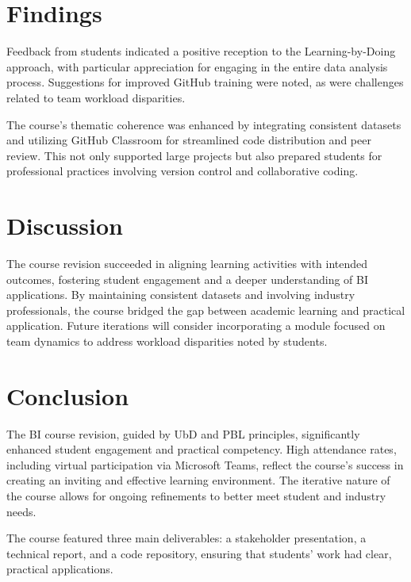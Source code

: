 \documentclass{article}
\begin{document}
\section{Findings}
Feedback from students indicated a positive reception to the Learning-by-Doing approach, with particular appreciation for engaging in the entire data analysis process. Suggestions for improved GitHub training were noted, as were challenges related to team workload disparities.

The course's thematic coherence was enhanced by integrating consistent datasets and utilizing GitHub Classroom for streamlined code distribution and peer review. This not only supported large projects but also prepared students for professional practices involving version control and collaborative coding.

\section{Discussion}
The course revision succeeded in aligning learning activities with intended outcomes, fostering student engagement and a deeper understanding of BI applications. By maintaining consistent datasets and involving industry professionals, the course bridged the gap between academic learning and practical application. Future iterations will consider incorporating a module focused on team dynamics to address workload disparities noted by students.

\section{Conclusion}
The BI course revision, guided by UbD and PBL principles, significantly enhanced student engagement and practical competency. High attendance rates, including virtual participation via Microsoft Teams, reflect the course's success in creating an inviting and effective learning environment. The iterative nature of the course allows for ongoing refinements to better meet student and industry needs.


The course featured three main deliverables: a stakeholder presentation, a technical report, and a code repository, ensuring that students' work had clear, practical applications.
\end{document}
